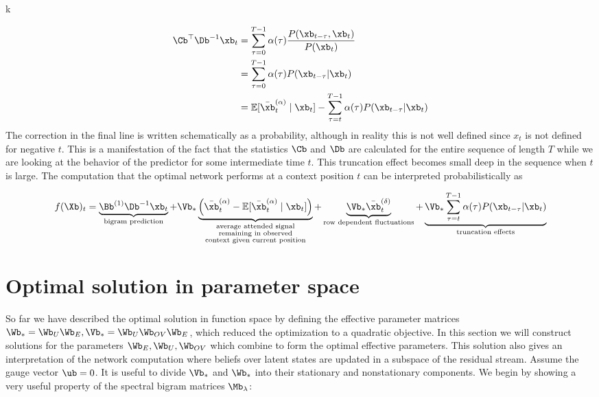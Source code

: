 k\documentclass{article}
\begin{document}
\begin{align}
 \Cb^\top\Db^{-1} \xb_t &= \sum_{\tau = 0}^{T-1} \alpha(\tau) \frac{P(\xb_{t-\tau}, \xb_t)}{P({\xb_{t}})} \\
 &= \sum_{\tau = 0}^{T-1} \alpha(\tau) P(\xb_{t-\tau} | \xb_{t}) \\
 &= \mathbb{E}[\bar{\xb}_t^{(\alpha)} \mid \xb_t] -  \sum_{\tau = t}^{T-1} \alpha(\tau) P(\xb_{t-\tau} | \xb_{t})
\end{align}
The correction in the final line is written schematically as a probability, although in reality this is not well defined since $x_t$ is not defined for negative $t$. This is a manifestation of the fact that the statistics $\Cb$ and $\Db$ are calculated for the entire sequence of length $T$ while we are looking at the behavior of the predictor for some intermediate time $t$. This truncation effect becomes small deep in the sequence when $t$ is large. The computation that the optimal network performs at a context position $t$ can be interpreted probabilistically as

\begin{equation}
    f(\Xb)_t = \underbrace{\Bb^{(1)}\Db^{-1}\xb_t}_{\text{bigram prediction}} + \Vb_* \underbrace{\left ( \bar{\xb}_t^{(\alpha)} -  \mathbb{E}[\bar{\xb}_t^{(\alpha)} \mid \xb_t] \right )}_{\substack{\text{average attended signal} \\ \text{remaining in observed} \\\text{context given current position}}} + \underbrace{  \Vb_*\bar{\xb}_t^{(\delta)}}_{\text{row dependent fluctuations}} + \underbrace{ \Vb_*\sum_{\tau = t}^{T-1} \alpha(\tau) P(\xb_{t-\tau} | \xb_{t})}_{\text{truncation effects}}
\end{equation}



\section{Optimal solution in parameter space}
So far we have described the optimal solution in function space by defining the effective parameter matrices $\Wb_* = \Wb_U\Wb_E, \Vb_* = \Wb_U \Wb_{OV}\Wb_E$, which reduced the optimization to a quadratic objective. In this section we will construct solutions for the parameters $\Wb_E, \Wb_U, \Wb_{OV}$ which combine to form the optimal effective parameters. This solution also gives an interpretation of the network computation where beliefs over latent states are updated in a subspace of the residual stream. Assume the gauge vector $\ub = 0$. It is useful to divide $\Vb_*$ and $\Wb_*$ into their stationary and nonstationary components. We begin by showing a very useful property of the spectral bigram matrices $\Mb_\lambda$:
\end{document}
